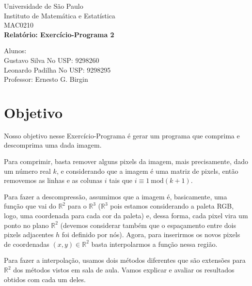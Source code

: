 \documentclass{article}
\newcommand\tab[1][1cm]{\hspace*{#1}}
\begin{document}
	\begin{titlepage} %
	\begin{center} %
	{\large Universidade de São Paulo}\\[0.2cm] %
	{\large Instituto de Matemática e Estatística}\\[0.2cm] %
	{\large MAC0210}\\[5.1cm]
	{\bf \huge Relat\'orio: Exerc\'icio-Programa 2}\\[5.1cm] %
	\end{center} %
	{\large Alunos:}\\ 
	{Gustavo Silva \tab\tab\tab No USP: 9298260\\
	 Leonardo Padilha \tab\tab\tab No USP: 9298295}\\[0.7cm] %
	{\large Professor: Ernesto G. Birgin}\\[5.1cm]
	\end{titlepage} %
	
	\tableofcontents
	\pagebreak
	\section{Objetivo}
	\setlength{\parindent}{10ex}
	Nosso objetivo nesse Exercício-Programa é gerar um programa que comprima e descomprima uma dada imagem. \par
	Para comprimir, basta remover alguns pixels da imagem, mais precisamente, dado um número real $k$, e considerando que a imagem é uma matriz de pixels, então removemos as linhas e as colunas $i$ tais que $i \equiv 1\ \textrm{mod}(k + 1)$. \par
	Para fazer a descompressão, assumimos que a imagem é, basicamente, uma função que vai do $\mathbb{R}^2$ para o $\mathbb{R}^3$ ($\mathbb{R}^3$ pois estamos considerando a paleta RGB, logo, uma coordenada para cada cor da paleta) e, dessa forma, cada pixel vira um ponto no plano $\mathbb{R}^2$ (devemos considerar também que o espaçamento entre dois pixels adjacentes $h$ foi definido por nós). Agora, para inserirmos os novos pixels de coordenadas $(x, y) \in \mathbb{R}^2$ basta interpolarmos a função nessa região. \par
	Para fazer a interpolação, usamos dois métodos diferentes que são extensões para $\mathbb{R}^2$ dos métodos vistos em sala de aula. Vamos explicar e avaliar os resultados obtidos com cada um deles.
	
\end{document}
